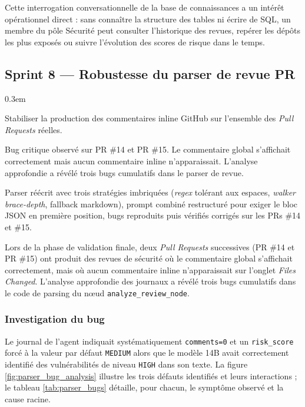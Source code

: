         Cette interrogation conversationnelle de la base de connaissances a un
        intérêt opérationnel direct : sans connaître la structure des tables ni
        écrire de SQL, un membre du pôle Sécurité peut consulter l'historique des
        revues, repérer les dépôts les plus exposés ou suivre l'évolution des
        scores de risque dans le temps.

    \subsection{Sprint 8 — Robustesse du parser de revue PR}

        \begin{description}
            \itemsep 0.3em
            \item[Objectif du sprint :] Stabiliser la production des commentaires
                inline GitHub sur l'ensemble des \textit{Pull Requests} réelles.
            \item[Obstacles rencontrés :] Bug critique observé sur PR \#14 et PR
                \#15. Le commentaire global s'affichait correctement mais aucun
                commentaire inline n'apparaissait. L'analyse approfondie a révélé
                trois bugs cumulatifs dans le parser de revue.
            \item[Livrable :] Parser réécrit avec trois stratégies imbriquées
                (\textit{regex} tolérant aux espaces, \textit{walker brace-depth},
                fallback markdown), prompt combiné restructuré pour exiger le bloc
                JSON en première position, bugs reproduits puis vérifiés corrigés
                sur les PRs \#14 et \#15.
        \end{description}

        Lors de la phase de validation finale, deux \textit{Pull Requests} successives
        (PR \#14 et PR \#15) ont produit des revues de sécurité où le commentaire global
        s'affichait correctement, mais où aucun commentaire inline n'apparaissait sur
        l'onglet \textit{Files Changed}. L'analyse approfondie des journaux a révélé trois
        bugs cumulatifs dans le code de parsing du nœud \texttt{analyze\_\allowbreak{}review\_\allowbreak{}node}.

        \subsubsection{Investigation du bug}

        Le journal de l'agent indiquait systématiquement \texttt{comments=0} et un
        \texttt{risk\_score} forcé à la valeur par défaut \texttt{MEDIUM} alors que le
        modèle 14B avait correctement identifié des vulnérabilités de niveau \texttt{HIGH}
        dans son texte. La figure \ref{fig:parser_bug_analysis} illustre les trois
        défauts identifiés et leurs interactions ; le tableau \ref{tab:parser_bugs}
        détaille, pour chacun, le symptôme observé et la cause racine.

